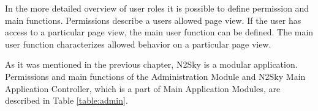 In the more detailed overview of user roles it is possible to define permission and main functions.
Permissions describe a users allowed page view. If the user has access to a particular page view, the main user function can be defined. 
The main user function characterizes allowed behavior on a particular page view. 

As it was mentioned in the previous chapter,  N2Sky is a modular application. Permissions and main functions of the Administration Module and N2Sky Main Application Controller, which is a part of Main Application Modules, are described in Table \ref{table:admin}.

\begin{table}[]
\caption{User Roles main functions considering "Administration Module" and "N2Sky Main Application Controller". 
"+" for allowed, "-" for disallowed}
\label{table:admin}
\end{table}

